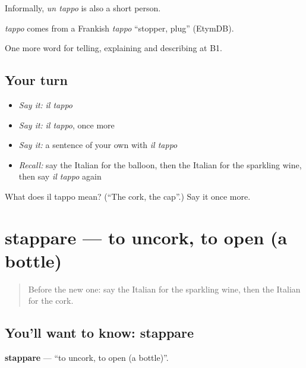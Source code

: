 Informally, \emph{un tappo} is also a short person.

\begin{cousinweb}
\emph{tappo} comes from a Frankish \emph{tappo} \textquotedblleft{}stopper, plug\textquotedblright{} (EtymDB).
\end{cousinweb}

\begin{grammarlens}[title={What you've built}]
One more word for telling, explaining and describing at B1.
\end{grammarlens}

\subsection*{Your turn}
\begin{itemize}
\raggedright
  \item \emph{Say it:} \emph{il tappo}
  \item \emph{Say it:} \emph{il tappo}, once more
  \item \emph{Say it:} a sentence of your own with \emph{il tappo}
  \item \emph{Recall:} say the Italian for the balloon, then the Italian for the sparkling wine, then say \emph{il tappo} again
\end{itemize}

\begin{tcolorbox}[breakable,colback=teal!4,colframe=teal!35!black,title={Before you move on}]
What does il tappo mean? (\textquotedblleft{}The cork, the cap\textquotedblright{}.) Say it once more.
\end{tcolorbox}
\section[stappare]{stappare — to uncork, to open (a bottle)}

\label{lesson:IT-C317-stappare}



\begin{quote}
Before the new one: say the Italian for the sparkling wine, then the Italian for the cork.
\end{quote}

\subsection*{You'll want to know: stappare}
\textbf{stappare} — \textquotedblleft{}to uncork, to open (a bottle)\textquotedblright{}.

